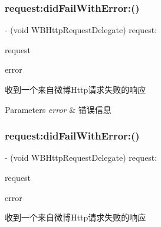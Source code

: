 \subsubsection{\texorpdfstring{request\+:did\+Fail\+With\+Error\+:()}{request:didFailWithError:()}\hspace{0.1cm}{\footnotesize\ttfamily [2/3]}}
{\footnotesize\ttfamily -\/ (void W\+B\+Http\+Request\+Delegate) request\+: \begin{DoxyParamCaption}\item[{(\mbox{\hyperlink{interface_w_b_http_request}{W\+B\+Http\+Request}} $\ast$)}]{request }\item[{didFailWithError:(N\+S\+Error $\ast$)}]{error }\end{DoxyParamCaption}\hspace{0.3cm}{\ttfamily [optional]}}

收到一个来自微博\+Http请求失败的响应


\begin{DoxyParams}{Parameters}
{\em error} & 错误信息 \\
\hline
\end{DoxyParams}
\mbox{\label{protocol_w_b_http_request_delegate_01-p_a1d6301f145c81842890d428579020c30}} 
\subsubsection{\texorpdfstring{request\+:did\+Fail\+With\+Error\+:()}{request:didFailWithError:()}\hspace{0.1cm}{\footnotesize\ttfamily [3/3]}}
{\footnotesize\ttfamily -\/ (void W\+B\+Http\+Request\+Delegate) request\+: \begin{DoxyParamCaption}\item[{(\mbox{\hyperlink{interface_w_b_http_request}{W\+B\+Http\+Request}} $\ast$)}]{request }\item[{didFailWithError:(N\+S\+Error $\ast$)}]{error }\end{DoxyParamCaption}\hspace{0.3cm}{\ttfamily [optional]}}

收到一个来自微博\+Http请求失败的响应


